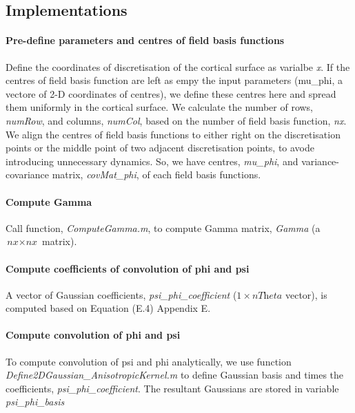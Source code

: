 \documentclass[a4paper, 12pt, english]{article}
\begin{document}
\subsection{Implementations}

\paragraph{Pre-define parameters and centres of field basis functions\newline}
Define the coordinates of discretisation of the cortical surface as varialbe \textit{x}. If the centres of field basis function are left as empy the input parameters (mu\_phi, a
vectore of 2-D coordinates of centres), we define these centres here and spread them
uniformly in the cortical surface. \newline
We calculate the number of rows, \textit{numRow}, and columns, \textit{numCol}, based on the
number of field basis function, \textit{nx}.\newline
We align the centres of field basis functions to either right on the
discretisation points or the middle point of two adjacent discretisation
points, to avode introducing unnecessary dynamics. \newline
So, we have centres, \textit{mu\_phi}, and variance-covariance matrix, \textit{covMat\_phi},
of each field basis functions.\newline
\paragraph{Compute Gamma\newline}
Call function, \textit{ComputeGamma.m}, to compute Gamma matrix, \textit{Gamma} (a \(\textit{nx}\times
\textit{nx}\) matrix).\newline

\paragraph{Compute coefficients of convolution of phi and psi\newline}
A vector of Gaussian coefficients, \textit{psi\_phi\_coefficient} (\(1\times\textit{nTheta}\) vector), is computed based on Equation
(E.4) Appendix E.

\paragraph{Compute convolution of phi and psi\newline}
To compute convolution of psi and phi analytically, we use function \textit{Define2DGaussian\_AnisotropicKernel.m}
to define Gaussian basis and times the coefficients, \textit{psi\_phi\_coefficient}.
The resultant Gaussians are stored in variable \textit{psi\_phi\_basis}
\end{document}
